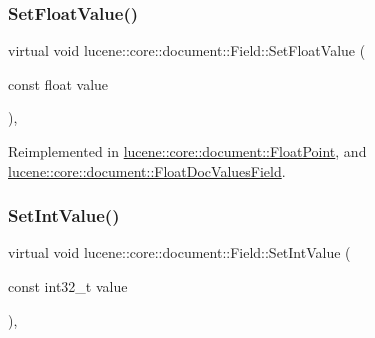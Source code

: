 \mbox{\label{classlucene_1_1core_1_1document_1_1Field_aa22291dffcf6a545fd6c24f23fbb8b50}} 
\subsubsection{\texorpdfstring{Set\+Float\+Value()}{SetFloatValue()}}
{\footnotesize\ttfamily virtual void lucene\+::core\+::document\+::\+Field\+::\+Set\+Float\+Value (\begin{DoxyParamCaption}\item[{const float}]{value }\end{DoxyParamCaption})\hspace{0.3cm}{\ttfamily [inline]}, {\ttfamily [virtual]}}



Reimplemented in \mbox{\hyperlink{classlucene_1_1core_1_1document_1_1FloatPoint_a4e1f81bce5f905e267a32c4882faf90e}{lucene\+::core\+::document\+::\+Float\+Point}}, and \mbox{\hyperlink{classlucene_1_1core_1_1document_1_1FloatDocValuesField_a929d0812b571be2208f51d420b0dd9ed}{lucene\+::core\+::document\+::\+Float\+Doc\+Values\+Field}}.

\mbox{\label{classlucene_1_1core_1_1document_1_1Field_a6aee080f0bf507f8c6a5cfc64bd913a2}} 
\subsubsection{\texorpdfstring{Set\+Int\+Value()}{SetIntValue()}}
{\footnotesize\ttfamily virtual void lucene\+::core\+::document\+::\+Field\+::\+Set\+Int\+Value (\begin{DoxyParamCaption}\item[{const int32\+\_\+t}]{value }\end{DoxyParamCaption})\hspace{0.3cm}{\ttfamily [inline]}, {\ttfamily [virtual]}}




